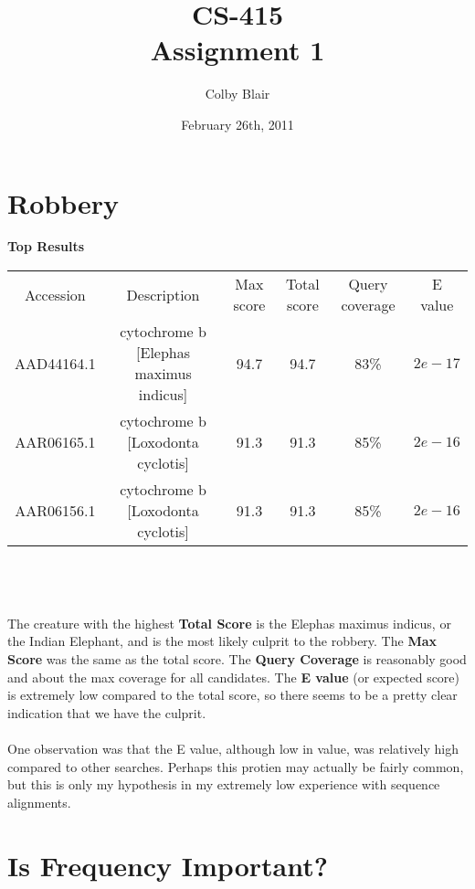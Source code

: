 \documentclass[12pt]{article}
\title{CS-415 \\
	Assignment 1
}
\author{Colby Blair}
\date{February 26th, 2011}
\begin{document}
	\maketitle

	\section{Robbery}
		\textbf{Top Results} \\
		\scriptsize
		\begin{tabular}{|c|c|c|c|c|c|}
			\hline
			Accession	&	Description	&	Max score	&	Total score	&	Query coverage	&	E value \\
			 AAD44164.1	&	cytochrome b [Elephas maximus indicus]	&	94.7	&	94.7	&	83\%	&	$2e-17$ \\
			AAR06165.1 	&	cytochrome b [Loxodonta cyclotis]	&	91.3	&	91.3	&	85\%	&	$2e-16$ \\
			AAR06156.1 	&	cytochrome b [Loxodonta cyclotis]	&	91.3	&	91.3	&	85\%	&	$2e-16$ \\
			\hline
		\end{tabular} \\
		\normalsize
	\\ \\
	The creature with the highest \textbf{Total Score} is the Elephas maximus indicus, or the Indian Elephant, and is the most likely culprit to the robbery. The \textbf{Max Score} was the same as the total score. The \textbf{Query Coverage} is reasonably good and about the max coverage for all candidates. The \textbf{E value} (or expected score) is extremely low compared to the total score, so there seems to be a pretty clear indication that we have the culprit.
	\\ \\
	One observation was that the E value, although low in value, was relatively high compared to other searches. Perhaps this protien may actually be fairly common, but this is only my hypothesis in my extremely low experience with sequence alignments.


	\section{Is Frequency Important?}
\end{document}
